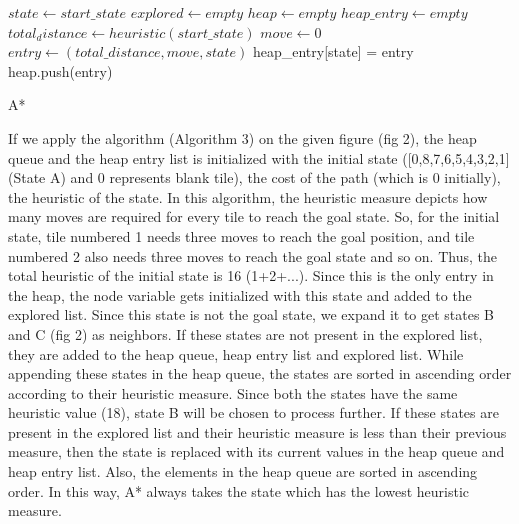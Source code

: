 \documentclass{svproc}
\begin{document}
\setlength{\intextsep}{5pt}
\begin{algorithm}
	\SetAlgoLined
	$state \gets start\_state$\;
	$explored \gets empty$\;
	$heap \gets empty$\;
	$heap\_entry \gets empty$\;
	$total_distance \gets heuristic(start\_state)$\;
	$move \gets 0$\;
	$entry \gets (total\_distance, move, state)$\;
	heap\_entry[state] = entry\;
	heap.push(entry)\;
	\caption{A*}
\end{algorithm}
\noindent If we apply the algorithm (Algorithm 3)  on the given figure (fig 2), the heap queue and the heap entry list is initialized with the initial state ([0,8,7,6,5,4,3,2,1] (State A) and 0 represents blank tile), the cost of the path (which is 0 initially), the heuristic of the state. In this algorithm, the heuristic measure depicts how many moves are required for every tile to reach the goal state. So, for the initial state, tile numbered 1 needs three moves to reach the goal position, and tile numbered 2 also needs three moves to reach the goal state and so on. Thus, the total heuristic of the initial state is 16 (1+2+...). Since this is the only entry in the heap, the node variable gets initialized with this state and added to the explored list. Since this state is not the goal state, we expand it to get states B and C (fig 2) as neighbors. If these states are not present in the explored list, they are added to the heap queue, heap entry list and explored list. While appending these states in the heap queue, the states are sorted in ascending order according to their heuristic measure. Since both the states have the same heuristic value (18), state B will be chosen to process further. If these states are present in the explored list and their heuristic measure is less than their previous measure, then the state is replaced with its current values in the heap queue and heap entry list. Also, the elements in the heap queue are sorted in ascending order. In this way, A* always takes the state which has the lowest heuristic measure.
\end{document}
